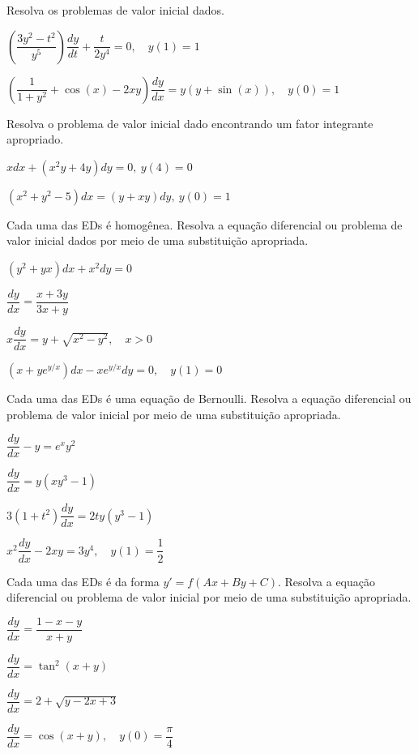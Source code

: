 \documentclass[oneside,12pt,a4paper]{report}
\begin{document}
     Resolva os problemas de valor inicial dados.
    \begin{itensquestao}[1]
        \item $\left(\dfrac{3y^2-t^2}{y^5}\right)\dfrac{dy}{dt}+\dfrac{t}{2y^4}=0,\quad y(1)=1$
        \item $\left(\dfrac{1}{1+y^2}+\cos(x)-2xy\right)\dfrac{dy}{dx}=y(y+\sin(x)),\quad y(0)=1$
    \end{itensquestao}

     Resolva o problema de valor inicial dado encontrando um fator integrante apropriado.
    \begin{itensquestao}[1]
        \item $xdx+(x^2y+4y)dy=0,~y(4)=0$
        \item $(x^2+y^2-5)dx=(y+xy)dy,~y(0)=1$
    \end{itensquestao}

     Cada uma das EDs é homogênea. Resolva a equação diferencial ou problema de valor inicial dados por meio de uma substituição apropriada.
    \begin{itensquestao}[1]
        \item $(y^2+yx)dx+x^2dy=0$
        \item $\dfrac{dy}{dx}=\dfrac{x+3y}{3x+y}$
        \item $x\dfrac{dy}{dx}=y+\sqrt{x^2-y^2},\quad x>0$
        \item $(x+ye^{y/x})dx-xe^{y/x}dy=0, \quad y(1)=0$
    \end{itensquestao}

     Cada uma das EDs é uma equação de Bernoulli. Resolva a equação diferencial ou problema de valor inicial por meio de uma substituição apropriada.
    \begin{itensquestao}[1]
        \item $\dfrac{dy}{dx}-y=e^xy^2$
        \item $\dfrac{dy}{dx}=y(xy^3-1)$
        \item $3(1+t^2)\dfrac{dy}{dx}=2ty(y^3-1)$
        \item $x^2\dfrac{dy}{dx}-2xy=3y^4,\quad y(1)=\dfrac{1}{2}$
    \end{itensquestao}

     Cada uma das EDs é da forma $y'=f(Ax+By+C)$. Resolva a equação diferencial ou problema de valor inicial por meio de uma substituição apropriada.
    \begin{itensquestao}[1]
        \item $\dfrac{dy}{dx}=\dfrac{1-x-y}{x+y}$
        \item $\dfrac{dy}{dx}=\tan^2(x+y)$
        \item $\dfrac{dy}{dx}=2+\sqrt{y-2x+3}$
        \item $\dfrac{dy}{dx}=\cos(x+y),\quad y(0)=\dfrac{\pi}{4}$
    \end{itensquestao}
\end{document}
